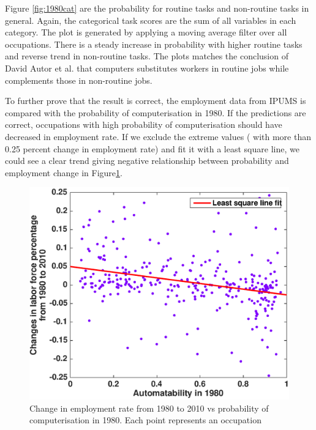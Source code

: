 \documentclass[11pt]{report}
\numberwithin{equation}{chapter}
\begin{document}
\begin{spacing}{2}
Figure \ref{fig:1980cat} are the probability for routine tasks and non-routine tasks in general. Again, the categorical task scores are the sum of all variables in each category. The plot is generated by applying a moving average filter over all occupations. There is a steady increase in probability with higher routine tasks and reverse trend in non-routine tasks. The plots matches the conclusion of David Autor et al.\cite{david2001skill} that computers substitutes workers in routine jobs while complements those in non-routine jobs. 


To further prove that the result is correct, the employment data from IPUMS\cite{IPUMS1990} is compared with the probability of computerisation in 1980. If the predictions are  correct, occupations with high probability of computerisation should have decreased in employment rate\footnotemark. If we exclude the extreme values ( with more than 0.25 percent change in employment rate) and fit it with a least square line, we could see a clear trend giving negative relationship between probability and employment change in Figure\ref{fig:labor_change}.



 
\begin{figure}[htb]
\centering
\includegraphics[scale=0.7]{labor_change.eps}
\caption{Change in employment rate from 1980 to 2010 vs probability of computerisation in 1980. Each point represents an occupation }
\label{fig:labor_change}
\end{figure}


\end{spacing}
\end{document}
